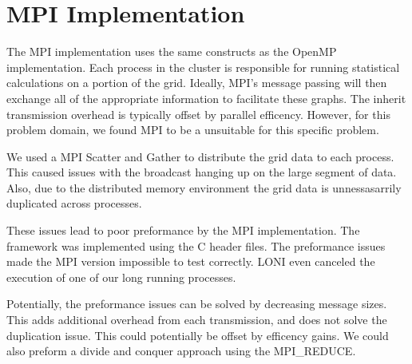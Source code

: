 \section{MPI Implementation}

The MPI implementation uses the same constructs as the OpenMP implementation.
Each process in the cluster is responsible for running statistical calculations on a portion of the grid.
Ideally, MPI's message passing will then exchange all of the appropriate information to facilitate these graphs.
The inherit transmission overhead is typically offset by parallel efficency.
However, for this problem domain, we found MPI to be a unsuitable for this specific problem.

\par
We used a MPI Scatter and Gather to distribute the grid data to each process.
This caused issues with the broadcast hanging up on the large segment of data.
Also, due to the distributed memory environment the grid data is unnessasarrily duplicated across processes.

\par
These issues lead to poor preformance by the MPI implementation.
The framework was implemented using the C header files.
The preformance issues made the MPI version impossible to test correctly.
LONI even canceled the execution of one of our long running processes.

\par
Potentially, the preformance issues can be solved by decreasing message sizes.
This adds additional overhead from each transmission, and does not solve the duplication issue.
This could potentially be offset by efficency gains.
We could also preform a divide and conquer approach using the MPI_REDUCE.